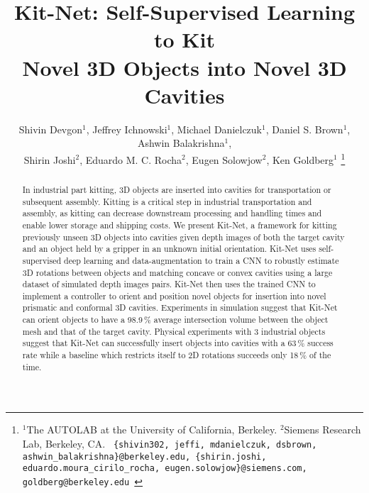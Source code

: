 \documentclass[letterpaper, 10 pt, conference]{ieeeconf}  %
\title{\LARGE \bf
Kit-Net: Self-Supervised Learning to Kit \\Novel 3D Objects into Novel 3D Cavities
}
\author{Shivin Devgon$^{1}$, Jeffrey Ichnowski$^{1}$, Michael Danielczuk$^{1}$, Daniel S. Brown$^{1}$, Ashwin Balakrishna$^{1}$, \\
Shirin Joshi$^{2}$, Eduardo M. C. Rocha$^{2}$, Eugen Solowjow$^{2}$, Ken Goldberg$^{1}$ %
\thanks{$^{1}$The AUTOLAB at the University of California, Berkeley. %
$^{2}$Siemens Research Lab, Berkeley, CA.
{\tt\small
  \{shivin302, jeffi, mdanielczuk, dsbrown, ashwin\_balakrishna\}\allowbreak @berkeley.edu,
  \{shirin.joshi, eduardo.moura\_cirilo\_rocha,
  eugen.solowjow\}\allowbreak @siemens.com,
  goldberg@berkeley.edu }
}%
}
\renewcommand{\bibfont}{\small}
\begin{document}
\maketitle

\begin{abstract}
In industrial part kitting, 3D objects are inserted into cavities for transportation or subsequent assembly. Kitting is a critical step in industrial transportation and assembly, as kitting can decrease downstream processing and handling times and enable lower storage and shipping costs.
We present Kit-Net, a framework for kitting previously unseen 3D objects into cavities given depth images of both the target cavity and an object held by a gripper in an unknown initial orientation. Kit-Net uses self-supervised deep learning and data-augmentation to train a CNN to robustly estimate 3D rotations between objects and matching concave or convex cavities using a large dataset of simulated depth images pairs. Kit-Net then uses the trained CNN to implement a controller to orient and position novel objects for insertion into novel prismatic and conformal 3D cavities. Experiments in simulation suggest that Kit-Net can orient objects to have a 98.9\,\% average intersection volume between the object mesh and that of the target cavity. Physical experiments with 3 industrial objects suggest that Kit-Net can successfully insert objects into cavities with a 63\,\% success rate while a baseline which restricts itself to 2D rotations succeeds only 18\,\% of the time. 

\end{abstract}












\renewcommand*{\bibfont}{\footnotesize}
\printbibliography %
% 
\end{document}

